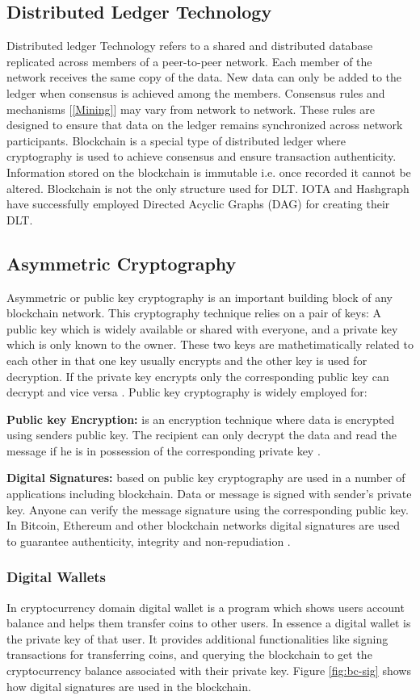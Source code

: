 \subsection{Distributed Ledger Technology} 
Distributed ledger Technology refers to a shared and distributed database replicated across members of a peer-to-peer network. Each member of the network receives the same copy of the data. New data can only be added to the ledger when consensus is achieved among the members. Consensus rules and mechanisms [\ref{Mining}] may vary from network to network. These rules are designed to ensure that data on the ledger remains synchronized across network participants. Blockchain is a special type of distributed ledger where cryptography is used to achieve consensus and ensure transaction authenticity.  Information stored on the blockchain is immutable i.e. once recorded it cannot be altered. Blockchain is not the only structure used for DLT. IOTA \cite{wiki:003} and Hashgraph have successfully employed Directed Acyclic Graphs (DAG) \cite{wiki:002} for creating their DLT. 
\subsection{Asymmetric Cryptography} \label{AC}
Asymmetric or public key cryptography is an important building block of any blockchain network. This cryptography technique relies on a pair of keys: A public key which is widely available or shared with everyone, and a private key which is only known to the owner. These two keys are mathetimatically related to each other in that one key usually encrypts and the other key is used for decryption. If the private key encrypts only the corresponding public key can decrypt and vice versa \cite{wiki:004}. Public key cryptography is widely employed for:

\textbf{Public key Encryption:} is an encryption technique where data is encrypted using senders public key. The recipient can only decrypt the data and read the message if he is in possession of the corresponding private key \cite{wiki:004}.

\textbf{Digital Signatures:} based on public key cryptography are used in a number of applications including blockchain. Data or message is signed with sender’s private key. Anyone can verify the message signature using the corresponding public key. In Bitcoin, Ethereum and other blockchain networks digital signatures are used to guarantee authenticity, integrity and non-repudiation \cite{wiki:004}.
\subsubsection{Digital Wallets}
In cryptocurrency domain digital wallet is a program which shows users account balance and helps them transfer coins to other users. In essence a digital wallet is the private key of that user. It provides additional functionalities like signing transactions for transferring coins, and querying the blockchain to get the cryptocurrency balance associated with their private key.  Figure \ref{fig:bc-sig} shows how digital signatures are used in the blockchain. 

